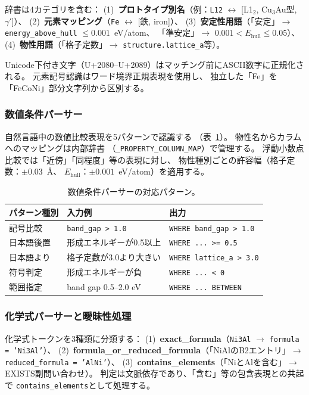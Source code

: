 \documentclass[5p,twocolumn]{elsarticle}
\begin{document}
辞書は4カテゴリを含む：
(1)~\textbf{プロトタイプ別名}（例：\texttt{L12} $\leftrightarrow$
[L1$_2$, Cu$_3$Au型, $\gamma'$]）、
(2)~\textbf{元素マッピング}（\texttt{Fe} $\leftrightarrow$ [鉄, iron]）、
(3)~\textbf{安定性用語}（「安定」$\to$
\texttt{energy\_above\_hull} $\leq 0.001$~eV/atom、
「準安定」$\to$ $0.001 < E_\text{hull} \leq 0.05$）、
(4)~\textbf{物性用語}（「格子定数」$\to$
\texttt{structure.lattice\_a}等）。

Unicode下付き文字（U+2080--U+2089）はマッチング前にASCII数字に正規化される。
元素記号認識はワード境界正規表現を使用し、
独立した「Fe」を「FeCoNi」部分文字列から区別する。

\subsubsection{数値条件パーサー}

自然言語中の数値比較表現を5パターンで認識する
（表~\ref{tab:numeric_patterns}）。
物性名からカラムへのマッピングは内部辞書
（\texttt{\_PROPERTY\_COLUMN\_MAP}）で管理する。
浮動小数点比較では「近傍」「同程度」等の表現に対し、
物性種別ごとの許容幅（格子定数：$\pm 0.03$~\AA、
$E_\text{hull}$：$\pm 0.001$~eV/atom）を適用する。

\begin{table}[t]
  \centering
  \caption{数値条件パーサーの対応パターン。}
  \label{tab:numeric_patterns}
  \scriptsize
  \begin{tabular}{lll}
    \toprule
    パターン種別 & 入力例 & 出力 \\
    \midrule
    記号比較 & \texttt{band\_gap > 1.0} & \texttt{WHERE band\_gap > 1.0} \\
    日本語後置 & 形成エネルギーが0.5以上 & \texttt{WHERE ... >= 0.5} \\
    日本語より & 格子定数が3.0より大きい & \texttt{WHERE lattice\_a > 3.0} \\
    符号判定 & 形成エネルギーが負 & \texttt{WHERE ... < 0} \\
    範囲指定 & band gap 0.5--2.0 eV & \texttt{WHERE ... BETWEEN} \\
    \bottomrule
  \end{tabular}
\end{table}

\subsubsection{化学式パーサーと曖昧性処理}

化学式トークンを3種類に分類する：
(1)~\textbf{exact\_formula}（\texttt{Ni3Al} $\to$ \texttt{formula = 'Ni3Al'}）、
(2)~\textbf{formula\_or\_reduced\_formula}（「NiAlのB2エントリ」$\to$
\texttt{reduced\_formula = 'AlNi'}）、
(3)~\textbf{contains\_elements}（「NiとAlを含む」$\to$ EXISTS副問い合わせ）。
判定は文脈依存であり、「含む」等の包含表現との共起で
\texttt{contains\_elements}として処理する。
\end{document}
